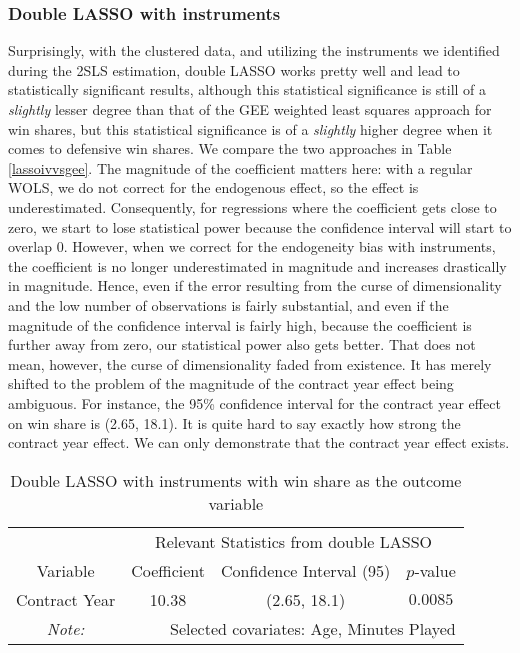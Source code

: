 \documentclass[12pt]{article}
\begin{document}
	\subsubsection{Double LASSO with instruments}
	
	Surprisingly, with the clustered data, and utilizing the instruments we identified during the 2SLS estimation, double LASSO works pretty well and lead to statistically significant results, although this statistical significance is still of a \emph{slightly} lesser degree than that of the GEE weighted least squares approach for win shares, but this statistical significance is of a \emph{slightly} higher degree when it comes to defensive win shares. We compare the two approaches in Table \ref{lassoivvsgee}. The magnitude of the coefficient matters here: with a regular WOLS, we do not correct for the endogenous effect, so the effect is underestimated. Consequently, for regressions where the coefficient gets close to zero, we start to lose statistical power because the confidence interval will start to overlap $0$. However, when we correct for the endogeneity bias with instruments, the coefficient is no longer underestimated in magnitude and increases drastically in magnitude. Hence, even if the error resulting from the curse of dimensionality and the low number of observations is fairly substantial, and even if the magnitude of the confidence interval is fairly high, because the coefficient is further away from zero, our statistical power also gets better. That does not mean, however, the curse of dimensionality faded from existence. It has merely shifted to the problem of the magnitude of the contract year effect being ambiguous. For instance, the 95\% confidence interval for the contract year effect on win share is (2.65, 18.1). It is quite hard to say exactly how strong the contract year effect. We can only demonstrate that the contract year effect exists.
	
	\begin{table}[!htbp]
		\centering
		\caption{Double LASSO with instruments with win share as the outcome variable}
		\label{lassoivws} 
		\begin{tabular}{*4c}
			\toprule
			& \multicolumn{3}{c}{Relevant Statistics from double LASSO} \\
			\cmidrule(lr){2-4}
			Variable & Coefficient  & Confidence Interval (95) & $p$-value \\
			\midrule
			Contract Year & 10.38       & (2.65, 18.1) & $0.0085$       \\
			\bottomrule
			\textit{Note:}  & \multicolumn{3}{r}{Selected covariates: Age, Minutes Played} \\ 
		\end{tabular}
	\end{table}
	
\end{document}
